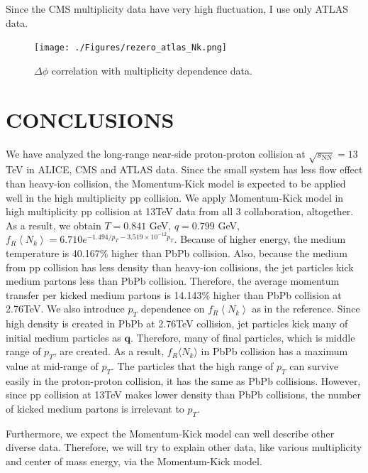 \documentclass[jkps,fleqn,showpacs,showkeys]{revtex4}
\begin{document}
Since the CMS multiplicity data have very high fluctuation, I use only ATLAS data.
\begin{figure}[ht]
\centering
\texttt{[image: ./Figures/rezero\_atlas\_Nk.png]}
\caption{$\Delta \phi$ correlation with multiplicity dependence data.}
\label{figure:multiplicity}
\end{figure}
    



\section*{CONCLUSIONS}
\label{sec:Conclusion}


We have analyzed the long-range near-side proton-proton collision at $\sqrt{s_\text{NN}}=13$TeV in ALICE, CMS and ATLAS data. 
Since the small system has less flow effect than heavy-ion collision, the Momentum-Kick model is expected to be applied well in the high multiplicity pp collision.
We apply Momentum-Kick model in high multiplicity pp collision at 13TeV data from all 3 collaboration, altogether. 
As a result, we obtain $T=0.841$ GeV, $q=0.799$ GeV, $f_R\left\langle N_k\right\rangle = 6.710e^{-1.494/p_T-3.519\times10^{-12}p_T}$.
Because of higher energy, the medium temperature is 40.167\% higher than PbPb collision.
Also, because the medium from pp collision has less density than heavy-ion collisions, the jet particles kick medium partons less than PbPb collision.
Therefore, the average momentum transfer per kicked medium partons is 14.143\% higher than PbPb collision at 2.76TeV.
We also introduce $p_T$ dependence on $f_R\left\langle N_k\right\rangle$ as in the reference\cite{PbPb}.
Since high density is created in PbPb at 2.76TeV collision, jet particles kick many of initial medium particles as $\textbf{q}$.
Therefore, many of final particles, which is middle range of $p_T$, are created.
As a result, $f_R \langle N_k \rangle$ in PbPb collision has a maximum value at mid-range of $p_T$.
The particles that the high range of $p_T$ can survive easily in the proton-proton collision, it has the same as PbPb collisions.
However, since pp collision at 13TeV makes lower density than PbPb collisions, the number of kicked medium partons is irrelevant to $p_T$.

Furthermore, we expect the Momentum-Kick model can well describe other diverse data.
Therefore, we will try to explain other data, like various multiplicity and center of mass energy, via the Momentum-Kick model.

\end{document}
